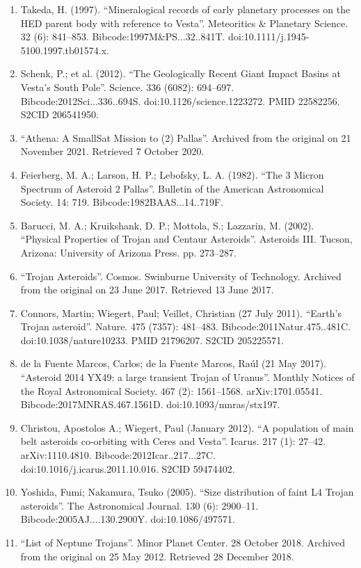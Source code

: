 \begin{enumerate}
\item Takeda, H. (1997). ``Mineralogical records of early planetary processes on the HED parent body with reference to Vesta''. Meteoritics \& Planetary Science. 32 (6): 841–853. Bibcode:1997M\&PS...32..841T. doi:10.1111/j.1945-5100.1997.tb01574.x.
\item Schenk, P.; et al. (2012). ``The Geologically Recent Giant Impact Basins at Vesta's South Pole''. Science. 336 (6082): 694–697. Bibcode:2012Sci...336..694S. doi:10.1126/science.1223272. PMID 22582256. S2CID 206541950.
\item ``Athena: A SmallSat Mission to (2) Pallas''. Archived from the original on 21 November 2021. Retrieved 7 October 2020.
\item Feierberg, M. A.; Larson, H. P.; Lebofsky, L. A. (1982). ``The 3 Micron Spectrum of Asteroid 2 Pallas''. Bulletin of the American Astronomical Society. 14: 719. Bibcode:1982BAAS...14..719F.
\item Barucci, M. A.; Kruikshank, D. P.; Mottola, S.; Lazzarin, M. (2002). ``Physical Properties of Trojan and Centaur Asteroids''. Asteroids III. Tucson, Arizona: University of Arizona Press. pp. 273–287.
\item ``Trojan Asteroids''. Cosmos. Swinburne University of Technology. Archived from the original on 23 June 2017. Retrieved 13 June 2017.
\item Connors, Martin; Wiegert, Paul; Veillet, Christian (27 July 2011). ``Earth's Trojan asteroid''. Nature. 475 (7357): 481–483. Bibcode:2011Natur.475..481C. doi:10.1038/nature10233. PMID 21796207. S2CID 205225571.
\item de la Fuente Marcos, Carlos; de la Fuente Marcos, Raúl (21 May 2017). ``Asteroid 2014 YX49: a large transient Trojan of Uranus''. Monthly Notices of the Royal Astronomical Society. 467 (2): 1561–1568. arXiv:1701.05541. Bibcode:2017MNRAS.467.1561D. doi:10.1093/mnras/stx197.
\item Christou, Apostolos A.; Wiegert, Paul (January 2012). ``A population of main belt asteroids co-orbiting with Ceres and Vesta''. Icarus. 217 (1): 27–42. arXiv:1110.4810. Bibcode:2012Icar..217...27C. doi:10.1016/j.icarus.2011.10.016. S2CID 59474402.
\item Yoshida, Fumi; Nakamura, Tsuko (2005). ``Size distribution of faint L4 Trojan asteroids''. The Astronomical Journal. 130 (6): 2900–11. Bibcode:2005AJ....130.2900Y. doi:10.1086/497571.
\item ``List of Neptune Trojans''. Minor Planet Center. 28 October 2018. Archived from the original on 25 May 2012. Retrieved 28 December 2018.

\end{enumerate}
